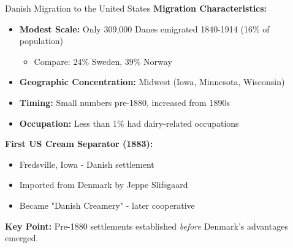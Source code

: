 \documentclass{beamer}
\begin{document}
\begin{frame}{Danish Migration to the United States}
\textbf{Migration Characteristics:}
\begin{itemize}
    \item \textbf{Modest Scale:} Only 309,000 Danes emigrated 1840-1914 (16\% of population)
    \begin{itemize}
        \item Compare: 24\% Sweden, 39\% Norway
    \end{itemize}
    \item \textbf{Geographic Concentration:} Midwest (Iowa, Minnesota, Wisconsin)
    \item \textbf{Timing:} Small numbers pre-1880, increased from 1890s
    \item \textbf{Occupation:} Less than 1\% had dairy-related occupations
\end{itemize}

\vspace{0.3cm}
\textbf{First US Cream Separator (1883):}
\begin{itemize}
    \item Fredsville, Iowa - Danish settlement
    \item Imported from Denmark by Jeppe Slifsgaard
    \item Became "Danish Creamery" - later cooperative
\end{itemize}

\vspace{0.2cm}
\textbf{Key Point:} Pre-1880 settlements established \textit{before} Denmark's advantages emerged.
\end{frame}
\end{document}
